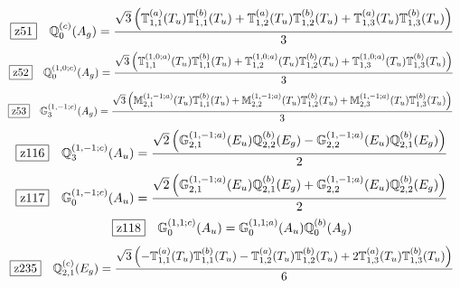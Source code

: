 \documentclass[fleqn,10pt,landscape]{jsarticle}
\begin{document}
\begin{dmath*}
\hspace*{3mm}\fbox{z51}\quad \mathbb{Q}_{0}^{(c)}(A_{g})=\frac{\sqrt{3} \left(\mathbb{T}_{1,1}^{(a)}(T_{u}) \mathbb{T}_{1,1}^{(b)}(T_{u}) + \mathbb{T}_{1,2}^{(a)}(T_{u}) \mathbb{T}_{1,2}^{(b)}(T_{u}) + \mathbb{T}_{1,3}^{(a)}(T_{u}) \mathbb{T}_{1,3}^{(b)}(T_{u})\right)}{3}
\end{dmath*}
\begin{dmath*}
\hspace*{3mm}\fbox{z52}\quad \mathbb{Q}_{0}^{(1,0;c)}(A_{g})=\frac{\sqrt{3} \left(\mathbb{T}_{1,1}^{(1,0;a)}(T_{u}) \mathbb{T}_{1,1}^{(b)}(T_{u}) + \mathbb{T}_{1,2}^{(1,0;a)}(T_{u}) \mathbb{T}_{1,2}^{(b)}(T_{u}) + \mathbb{T}_{1,3}^{(1,0;a)}(T_{u}) \mathbb{T}_{1,3}^{(b)}(T_{u})\right)}{3}
\end{dmath*}
\begin{dmath*}
\hspace*{3mm}\fbox{z53}\quad \mathbb{G}_{3}^{(1,-1;c)}(A_{g})=\frac{\sqrt{3} \left(\mathbb{M}_{2,1}^{(1,-1;a)}(T_{u}) \mathbb{T}_{1,1}^{(b)}(T_{u}) + \mathbb{M}_{2,2}^{(1,-1;a)}(T_{u}) \mathbb{T}_{1,2}^{(b)}(T_{u}) + \mathbb{M}_{2,3}^{(1,-1;a)}(T_{u}) \mathbb{T}_{1,3}^{(b)}(T_{u})\right)}{3}
\end{dmath*}
\begin{dmath*}
\hspace*{3mm}\fbox{z116}\quad \mathbb{Q}_{3}^{(1,-1;c)}(A_{u})=\frac{\sqrt{2} \left(\mathbb{G}_{2,1}^{(1,-1;a)}(E_{u}) \mathbb{Q}_{2,2}^{(b)}(E_{g}) - \mathbb{G}_{2,2}^{(1,-1;a)}(E_{u}) \mathbb{Q}_{2,1}^{(b)}(E_{g})\right)}{2}
\end{dmath*}
\begin{dmath*}
\hspace*{3mm}\fbox{z117}\quad \mathbb{G}_{0}^{(1,-1;c)}(A_{u})=\frac{\sqrt{2} \left(\mathbb{G}_{2,1}^{(1,-1;a)}(E_{u}) \mathbb{Q}_{2,1}^{(b)}(E_{g}) + \mathbb{G}_{2,2}^{(1,-1;a)}(E_{u}) \mathbb{Q}_{2,2}^{(b)}(E_{g})\right)}{2}
\end{dmath*}
\begin{dmath*}
\hspace*{3mm}\fbox{z118}\quad \mathbb{G}_{0}^{(1,1;c)}(A_{u})=\mathbb{G}_{0}^{(1,1;a)}(A_{u}) \mathbb{Q}_{0}^{(b)}(A_{g})
\end{dmath*}
\begin{dmath*}
\hspace*{3mm}\fbox{z235}\quad \mathbb{Q}_{2,1}^{(c)}(E_{g})=\frac{\sqrt{3} \left(- \mathbb{T}_{1,1}^{(a)}(T_{u}) \mathbb{T}_{1,1}^{(b)}(T_{u}) - \mathbb{T}_{1,2}^{(a)}(T_{u}) \mathbb{T}_{1,2}^{(b)}(T_{u}) + 2 \mathbb{T}_{1,3}^{(a)}(T_{u}) \mathbb{T}_{1,3}^{(b)}(T_{u})\right)}{6}
\end{dmath*}
\end{document}
